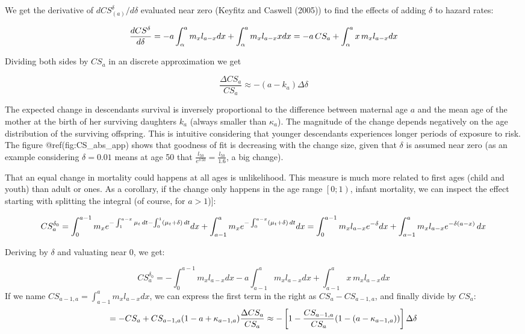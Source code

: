 \documentclass[
]{article}
\begin{document}
We get the derivative of \(dCS_{(a)}^\delta / d\delta\) evaluated near
zero (Keyfitz and Caswell (2005)) to find the effects of adding
\(\delta\) to hazard rates:

\[\frac{dCS^{\delta}}{d\delta} = -a\int_{\alpha}^{a}m_{x}{l_{a-x} dx} + \int_{\alpha}^{a} m_{x} {l_{a-x}x dx}\\
= -a \, CS_{a}  + \int_{\alpha}^{a} {x  \, m_{x} l_{a-x} dx}\]

Dividing both sides by \(CS_{a}\) in an discrete approximation we get

\[\frac{\Delta CS_{a}}{CS_{a}} \approx -(a - k_a) \Delta\delta\]

The expected change in descendants survival is inversely proportional to
the difference between maternal age \(a\) and the mean age of the mother
at the birth of her surviving daughters \(k_a\) (always smaller than
\(\kappa_a\)). The magnitude of the change depends negatively on the age
distribution of the surviving offspring. This is intuitive considering
that younger descendants experiences longer periods of exposure to risk.
The figure @ref(fig:CS\_abs\_app) shows that goodness of fit is
decreasing with the change size, given that \(\delta\) is assumed near
zero (as an example considering \(\delta=0.01\) means at age 50 that
\(\frac{l_50}{e^{\delta\,50}} = \frac{l_50}{1.6}\), a big change).

That an equal change in mortality could happens at all ages is
unlikelihood. This measure is much more related to first ages (child and
youth) than adult or ones. As a corollary, if the change only happens in
the age range \(\left[0;1\right)\), infant mortality, we can inspect the
effect starting with splitting the integral (of course, for \(a>1\)){]}:

\[CS_{a}^{\delta_0} = \int_{0}^{a-1} m_{x} {e{^{-\int_{1}^{a-x}\mu_t \,dt-\int_{0}^{1}(\mu_t + \delta)\,dt}}} dx + \int_{a-1}^{a} m_{x} e^{-\int_{0}^{a-x}(\mu_t+ \delta)\,dt}dx\\
=\int_{0}^{a-1} m_{x} l_{a-x}e^{-\delta} dx + \int_{a-1}^{a} m_{x} l_{a-x} e^{-\delta(a-x)}\,dx\]

Deriving by \(\delta\) and valuating near 0, we get:

\[CS_{a}^{\delta_0} =-\int_{0}^{a-1} m_{x} l_{a-x} dx - a \int_{a-1}^{a} {m_{x} l_{a-x} dx} + \int_{a-1}^{a} {x \, m_{x} l_{a-x} dx}\]
If we name \(CS_{a-1,a}=\int_{a-1}^{a} {m_{x} l_{a-x} dx}\), we can
express the first term in the right as \(CS_a - CS_{a-1,a}\), and
finally divide by \(CS_a\):
\[ = - CS_a + CS_{a-1,a} (1-a+\kappa_{a-1,a})\\
\frac{\Delta CS_{a}}{CS_{a}} \approx - \left[1-\frac{CS_{a-1,a}}{CS_a} (1-(a-\kappa_{a-1,a}))\right] \Delta\delta\]
\end{document}
